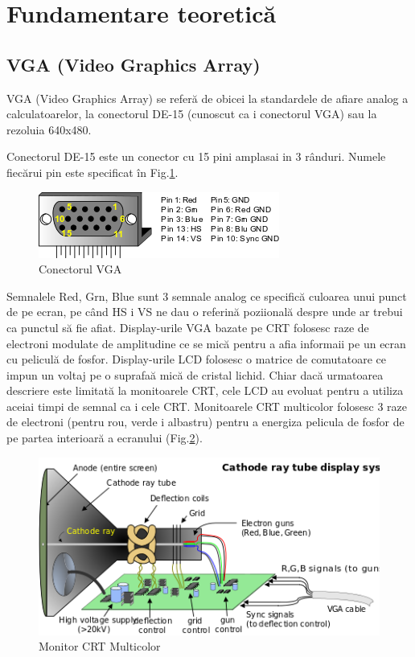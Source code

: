 \documentclass[a4paper,11pt,romanian]{article}
\begin{document}
\section{Fundamentare teoretic\u{a}}

\subsection{VGA (Video Graphics Array)}
\small{ 

VGA (Video Graphics Array) se refer\u{a} de obicei la standardele de afiare analog a calculatoarelor, la conectorul DE-15 (cunoscut ca i conectorul VGA) sau la rezoluia 640x480.

Conectorul DE-15 este un conector cu 15 pini amplasai in 3 r\^{a}nduri. Numele fiec\u{a}rui pin este specificat \^{i}n Fig.\ref{fig:vgaconnector}.
\begin{figure}
  \begin{center}
   \includegraphics[scale=0.55]{VGA_Connector.png}
   \caption{Conectorul VGA}
   \label{fig:vgaconnector}
  \end{center}
 \end{figure}
 Semnalele Red, Grn, Blue sunt 3 semnale analog ce specific\u{a} culoarea unui punct de pe ecran, pe c\^{a}nd HS i VS ne dau o referin\u{a} poziional\u{a} despre unde ar trebui ca punctul s\u{a} fie afiat. 
Display-urile VGA bazate pe CRT folosesc raze de electroni modulate de amplitudine ce se mic\u{a} pentru a afia informaii pe un ecran cu pelicul\u{a} de fosfor. Display-urile LCD folosesc o matrice de comutatoare ce impun un voltaj pe o suprafa\u{a} mic\u{a} de cristal lichid. Chiar dac\u{a} urmatoarea descriere este limitat\u{a} la monitoarele CRT, cele LCD au evoluat pentru a utiliza aceiai timpi de semnal ca i cele CRT. Monitoarele CRT multicolor folosesc 3 raze de electroni (pentru rou, verde i albastru) pentru a energiza pelicula de fosfor de pe partea interioar\u{a} a ecranului (Fig.\ref{fig:crtmonitor}).
\begin{figure}
  \begin{center}
   \includegraphics[scale=0.55]{CRT_Monitor.png}
   \caption{Monitor CRT Multicolor}
   \label{fig:crtmonitor}
  \end{center}
 \end{figure}

}
\end{document}
